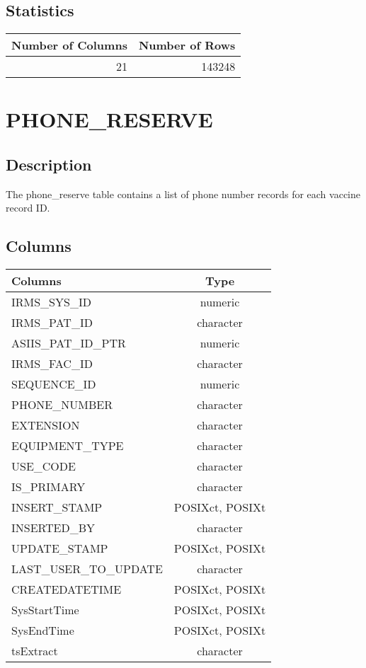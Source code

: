 \documentclass[
  letterpaper,
  DIV=11,
  numbers=noendperiod]{scrreprt}
\begin{document}
\hypertarget{statistics-31}{%
\section*{Statistics}\label{statistics-31}}

\begin{longtable}{rr}
\toprule
Number of Columns & Number of Rows \\ 
\midrule
21 & 143248 \\ 
\bottomrule
\end{longtable}

\hypertarget{phone_reserve}{%
\chapter*{PHONE\_RESERVE}\label{phone_reserve}}

\hypertarget{description-32}{%
\section*{Description}\label{description-32}}

The phone\_reserve table contains a list of phone number records for
each vaccine record ID.

\hypertarget{columns-32}{%
\section*{Columns}\label{columns-32}}

\begin{longtable}{lc}
\toprule
Columns & Type \\ 
\midrule
IRMS\_SYS\_ID & numeric \\ 
IRMS\_PAT\_ID & character \\ 
ASIIS\_PAT\_ID\_PTR & numeric \\ 
IRMS\_FAC\_ID & character \\ 
SEQUENCE\_ID & numeric \\ 
PHONE\_NUMBER & character \\ 
EXTENSION & character \\ 
EQUIPMENT\_TYPE & character \\ 
USE\_CODE & character \\ 
IS\_PRIMARY & character \\ 
INSERT\_STAMP & POSIXct, POSIXt \\ 
INSERTED\_BY & character \\ 
UPDATE\_STAMP & POSIXct, POSIXt \\ 
LAST\_USER\_TO\_UPDATE & character \\ 
CREATEDATETIME & POSIXct, POSIXt \\ 
SysStartTime & POSIXct, POSIXt \\ 
SysEndTime & POSIXct, POSIXt \\ 
tsExtract & character \\ 
\bottomrule
\end{longtable}
\end{document}

